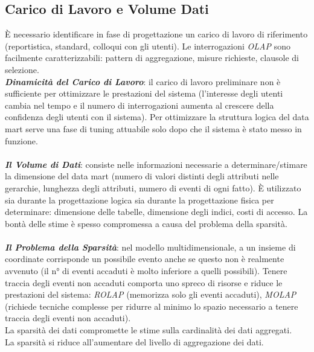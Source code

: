 \documentclass[a4paper, notitlepage, 9pt]{extreport}
\begin{document}
\subsection*{Carico di Lavoro e Volume Dati}
È necessario identificare in fase di progettazione un carico di lavoro di riferimento (reportistica, standard, colloqui con gli utenti). Le interrogazioni \textit{OLAP} sono facilmente caratterizzabili: pattern di aggregazione, misure richieste, clausole di selezione.
\\
\textit{\textbf{Dinamicità del Carico di Lavoro}}: il carico di lavoro preliminare non è sufficiente per ottimizzare le prestazioni del sistema (l'interesse degli utenti cambia nel tempo e il numero di interrogazioni aumenta al crescere della confidenza degli utenti con il sistema). Per ottimizzare la struttura logica del data mart serve una fase di tuning attuabile solo dopo che il sistema è stato messo in funzione.
\\\\
\textit{\textbf{Il Volume di Dati}}: consiste nelle informazioni necessarie a determinare/stimare la dimensione del data mart (numero di valori distinti degli attributi nelle gerarchie, lunghezza degli attributi, numero di eventi di ogni fatto). È utilizzato sia durante la progettazione logica sia durante la progettazione fisica per determinare: dimensione delle tabelle, dimensione degli indici, costi di accesso. La bontà delle stime è spesso compromessa a causa del problema della sparsità.
\\\\
\textit{\textbf{Il Problema della Sparsità}}: nel modello multidimensionale, a un insieme di coordinate corrisponde un possibile evento anche se questo non è realmente avvenuto (il n° di eventi accaduti è molto inferiore a quelli possibili). Tenere traccia degli eventi non accaduti comporta uno spreco di risorse e riduce le prestazioni del sistema: \textit{ROLAP} (memorizza solo gli eventi accaduti), \textit{MOLAP} (richiede tecniche complesse per ridurre al minimo lo spazio necessario a tenere traccia degli eventi non accaduti).\\
La sparsità dei dati compromette le stime sulla cardinalità dei dati aggregati.\\
La sparsità si riduce all’aumentare del livello di aggregazione dei dati.
\end{document}
